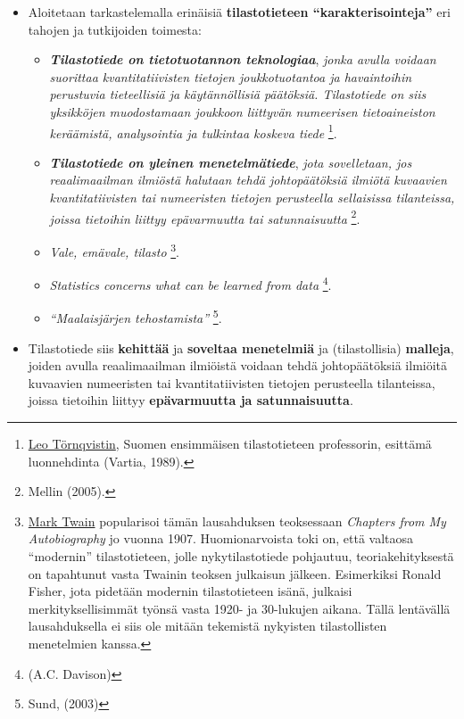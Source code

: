 \documentclass[
]{book}
\providecommand{\tightlist}{%
  \setlength{\itemsep}{0pt}\setlength{\parskip}{0pt}}
\begin{document}
\begin{itemize}
\tightlist
\item
  Aloitetaan tarkastelemalla erinäisiä \textbf{tilastotieteen ``karakterisointeja''} eri tahojen ja tutkijoiden toimesta:

  \begin{itemize}
  \tightlist
  \item
    \textbf{\emph{Tilastotiede on tietotuotannon teknologiaa}}, \emph{jonka avulla voidaan suorittaa kvantitatiivisten tietojen joukkotuotantoa ja havaintoihin perustuvia tieteellisiä ja käytännöllisiä päätöksiä. Tilastotiede on siis yksikköjen muodostamaan joukkoon liittyvän numeerisen tietoaineiston keräämistä, analysointia ja tulkintaa koskeva tiede} \footnote{\href{https://fi.wikipedia.org/wiki/Leo_T\%C3\%B6rnqvist}{Leo Törnqvistin}, Suomen ensimmäisen tilastotieteen professorin, esittämä luonnehdinta (Vartia, 1989).}.
  \item
    \textbf{\emph{Tilastotiede on yleinen menetelmätiede}}, \emph{jota sovelletaan, jos reaalimaailman ilmiöstä halutaan tehdä johtopäätöksiä ilmiötä kuvaavien kvantitatiivisten tai numeeristen tietojen perusteella sellaisissa tilanteissa, joissa tietoihin liittyy epävarmuutta tai satunnaisuutta} \footnote{Mellin (2005).}.
  \item
    \emph{Vale, emävale, tilasto} \footnote{\href{https://fi.wikipedia.org/wiki/Mark_Twain}{Mark Twain} popularisoi tämän lausahduksen teoksessaan \emph{Chapters from My Autobiography} jo vuonna 1907. Huomionarvoista toki on, että valtaosa ``modernin'' tilastotieteen, jolle nykytilastotiede pohjautuu, teoriakehityksestä on tapahtunut vasta Twainin teoksen julkaisun jälkeen. Esimerkiksi Ronald Fisher, jota pidetään modernin tilastotieteen isänä, julkaisi merkityksellisimmät työnsä vasta 1920- ja 30-lukujen aikana. Tällä lentävällä lausahduksella ei siis ole mitään tekemistä nykyisten tilastollisten menetelmien kanssa.}.
  \item
    \emph{Statistics concerns what can be learned from data} \footnote{(A.C. Davison)}.
  \item
    \emph{``Maalaisjärjen tehostamista''} \footnote{Sund, (2003)}.
  \end{itemize}
\item
  Tilastotiede siis \textbf{kehittää} ja \textbf{soveltaa menetelmiä} ja (tilastollisia) \textbf{malleja}, joiden avulla reaalimaailman ilmiöistä voidaan tehdä johtopäätöksiä ilmiöitä kuvaavien numeeristen tai kvantitatiivisten tietojen perusteella tilanteissa, joissa tietoihin liittyy \textbf{epävarmuutta ja satunnaisuutta}.


\end{itemize}
\end{document}
